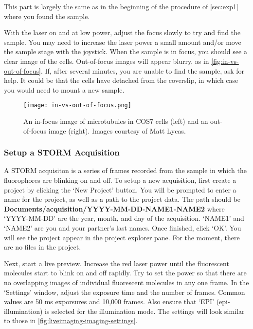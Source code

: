 \documentclass[10pt,a4paper,oneside]{book}
\begin{document}
This part is largely the same as in the beginning of the procedure of \autoref{sec:exp1} where you found the sample.

With the laser on and at low power, adjust the focus slowly to try and find the sample. You may need to increase the laser power a small amount and/or move the sample stage with the joystick. When the sample is in focus, you should see a clear image of the cells. Out-of-focus images will appear blurry, as in \autoref{fig:in-vs-out-of-focus}. If, after several minutes, you are unable to find the sample, ask for help. It could be that the cells have detached from the coverslip, in which case you would need to mount a new sample.

\begin{figure}[ht]
    \centering
    \texttt{[image: in-vs-out-of-focus.png]}
    \caption{An in-focus image of microtubules in COS7 cells (left) and an out-of-focus image (right). Images courtesy of Matt Lycas.}
    \label{fig:in-vs-out-of-focus}
\end{figure}

\subsubsection{Setup a STORM Acquisition}

A STORM acquisiton is a series of frames recorded from the sample in which the fluorophores are blinking on and off. To setup a new acquisition, first create a project by clicking the `New Project' button. You will be prompted to enter a name for the project, as well as a path to the project data. The path should be \textbf{Documents/acquisition/YYYY-MM-DD-NAME1-NAME2} where `YYYY-MM-DD' are the year, month, and day of the acquisition. `NAME1' and `NAME2' are you and your partner's last names. Once finished, click `OK'. You will see the project appear in the project explorer pane. For the moment, there are no files in the project.

Next, start a live preview. Increase the red laser power until the fluorescent molecules start to blink on and off rapidly. Try to set the power so that there are no overlapping images of individual fluorescent molecules in any one frame. In the `Settings' window, adjust the exposure time and the number of frames. Common values are 50 ms exporsures and 10,000 frames. Also ensure that `EPI' (epi-illumination) is selected for the illumination mode. The settings will look similar to those in \autoref{fig:liveimaging-imaging-settings}.
\end{document}
